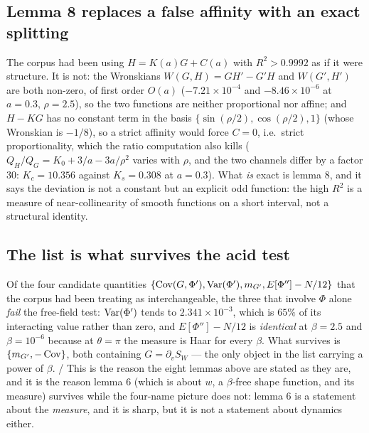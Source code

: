 
\subsection{Lemma 8 replaces a false affinity with an exact splitting}

The corpus had been using $H=K(a)G+C(a)$ with $R^{2}>0.9992$ as if it were structure. It is not:
the Wronskians $W(G,H)=GH'-G'H$ and $W(G',H')$ are both non-zero, of first order $O(a)$
($-7.21\times10^{-4}$ and $-8.46\times10^{-6}$ at $a=0.3$, $\rho=2.5$), so the two functions are
neither proportional nor affine; and $H-KG$ has no constant term in the basis
$\{\sin(\rho/2),\cos(\rho/2),1\}$ (whose Wronskian is $-1/8$), so a strict affinity would force
$C=0$, i.e.\ strict proportionality, which the ratio computation also kills
($Q_H/Q_G=K_0+3/a-3a/\rho^{2}$ varies with $\rho$, and the two channels differ by a factor $30$:
$K_c=10.356$ against $K_s=0.308$ at $a=0.3$). \LN{} What \emph{is} exact is lemma 8, and it says
the deviation is not a constant but an explicit odd function: the high $R^{2}$ is a measure of
near-collinearity of smooth functions on a short interval, not a structural identity. \LT{}


\subsection{The list is what survives the acid test}

Of the four candidate quantities $\{\operatorname{Cov}(G,\Phi'),\operatorname{Var}(\Phi'),m_{G'},E[\Phi'']-N/12\}$ that the
corpus had been treating as interchangeable, the three that involve $\Phi$ alone \emph{fail} the
free-field test: $\operatorname{Var}(\Phi')$ tends to $2.341\times10^{-3}$, which is $65\%$ of its interacting
value rather than zero, and $E[\Phi'']-N/12$ is \emph{identical} at $\beta=2.5$ and
$\beta=10^{-6}$ because at $\theta=\pi$ the measure is Haar for every $\beta$. What survives is
$\{m_{G'},-\operatorname{Cov}\}$, both containing $G=\partial_vS_W$ --- the only object in the list carrying a
power of $\beta$. \LT{}/\LE{} This is the reason the eight lemmas above are stated as they are, and
it is the reason lemma 6 (which is about $w$, a $\beta$-free shape function, and its measure)
survives while the four-name picture does not: lemma 6 is a statement about the \emph{measure},
and it is sharp, but it is not a statement about dynamics either.

